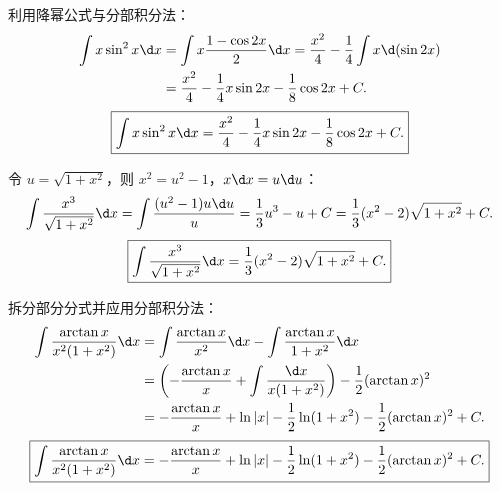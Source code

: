 \begin{solution}

    利用降幂公式与分部积分法：
    \begin{equation}
        \begin{aligned}
            \int x \sin^2 x \d x & = \int x \frac{1 - \cos 2x}{2} \d x = \frac{x^2}{4} - \frac{1}{4}\int x \d(\sin 2x) \\
                                 & = \frac{x^2}{4} - \frac{1}{4}x\sin 2x - \frac{1}{8}\cos 2x + C.
        \end{aligned}
    \end{equation}
    \begin{equation}
        \boxed{\int x \sin^2 x \d x = \frac{x^2}{4} - \frac{1}{4}x\sin 2x - \frac{1}{8}\cos 2x + C.}
    \end{equation}


    令 $u = \sqrt{1 + x^2}$，则 $x^2 = u^2 - 1$，$x \d x = u \d u$：
    \begin{equation}
        \int \frac{x^3}{\sqrt{1 + x^2}} \d x = \int \frac{(u^2 - 1) u \d u}{u} = \frac{1}{3}u^3 - u + C = \frac{1}{3}(x^2 - 2)\sqrt{1 + x^2} + C.
    \end{equation}
    \begin{equation}
        \boxed{\int \frac{x^3}{\sqrt{1 + x^2}} \d x = \frac{1}{3}(x^2 - 2)\sqrt{1 + x^2} + C.}
    \end{equation}


    拆分部分分式并应用分部积分法：
    \begin{equation}
        \begin{aligned}
            \int \frac{\arctan x}{x^2(1 + x^2)} \d x & = \int \frac{\arctan x}{x^2} \d x - \int \frac{\arctan x}{1 + x^2} \d x                         \\
                                                     & = \left( -\frac{\arctan x}{x} + \int \frac{\d x}{x(1 + x^2)} \right) - \frac{1}{2}(\arctan x)^2 \\
                                                     & = -\frac{\arctan x}{x} + \ln|x| - \frac{1}{2}\ln(1 + x^2) - \frac{1}{2}(\arctan x)^2 + C.
        \end{aligned}
    \end{equation}
    \begin{equation}
        \boxed{\int \frac{\arctan x}{x^2(1 + x^2)} \d x = -\frac{\arctan x}{x} + \ln|x| - \frac{1}{2}\ln(1 + x^2) - \frac{1}{2}(\arctan x)^2 + C.}
    \end{equation}


\end{solution}

